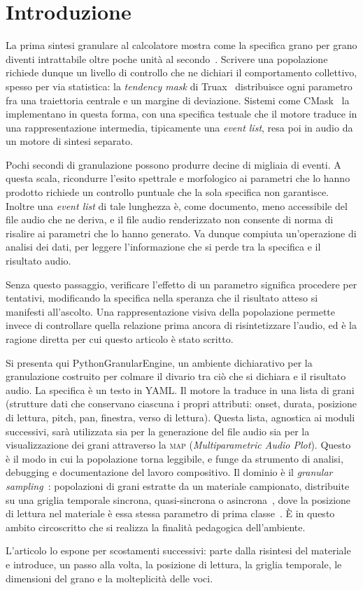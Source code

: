 \section{Introduzione}

La prima sintesi granulare al calcolatore mostra come la specifica grano per grano
diventi intrattabile oltre poche unità al secondo~\cite{Roads1978}. Scrivere
una popolazione richiede dunque un livello di controllo che ne dichiari il
comportamento collettivo, spesso per via statistica: la \emph{tendency mask}
di Truax~\cite{Truax1988} distribuisce ogni parametro fra una traiettoria
centrale e un margine di deviazione. Sistemi come CMask~\cite{Bartetzki1997}
la implementano in questa forma, con una specifica testuale che il motore
traduce in una rappresentazione intermedia, tipicamente una \emph{event list},
resa poi in audio da un motore di sintesi separato.

Pochi secondi di granulazione possono produrre decine di migliaia di eventi.
A questa scala, ricondurre l'esito spettrale e morfologico ai parametri che
lo hanno prodotto richiede un controllo puntuale che la sola specifica non
garantisce. Inoltre una \emph{event list} di tale lunghezza è, come documento, meno
accessibile del file audio che ne deriva, e il file audio renderizzato
non consente di norma di risalire ai parametri che lo
hanno generato. Va dunque compiuta un'operazione di analisi
dei dati, per leggere l'informazione che si perde tra la
specifica e il risultato audio.

Senza questo passaggio, verificare l'effetto di un parametro significa
procedere per tentativi, modificando la specifica nella speranza che il
risultato atteso si manifesti all'ascolto. Una rappresentazione visiva della
popolazione permette invece di controllare quella relazione prima ancora di
risintetizzare l'audio, ed è la ragione diretta per cui questo articolo è
stato scritto.

Si presenta qui PythonGranularEngine, un ambiente dichiarativo per
la granulazione costruito per colmare il divario tra ciò che si dichiara 
e il risultato audio. La specifica è un testo in YAML. Il motore la traduce 
in una lista di grani (strutture dati che
conservano ciascuna i propri attributi: onset, durata, posizione di lettura,
pitch, pan, finestra, verso di lettura). Questa lista, 
agnostica ai moduli successivi, sarà utilizzata sia per la generazione
del file audio sia per la visualizzazione dei grani
attraverso la \textsc{map} (\emph{Multiparametric
Audio Plot}). Questo è il modo in cui
la popolazione torna leggibile, e funge da strumento di analisi, debugging e
documentazione del lavoro compositivo. Il dominio è il \emph{granular sampling}~\cite{Lippe1993cim}:
popolazioni di grani estratte da un materiale campionato, distribuite su
una griglia temporale sincrona, quasi-sincrona o asincrona~\cite[p.~93]{Roads2001},
dove la posizione di lettura nel materiale è essa stessa parametro di
prima classe~\cite{Lippe1993cim}.
È in questo ambito circoscritto che si realizza la finalità
pedagogica dell'ambiente.

L'articolo lo espone per scostamenti successivi: parte dalla
risintesi del materiale e introduce, un passo alla volta, la posizione di
lettura, la griglia temporale, le dimensioni del
grano e la molteplicità delle voci.